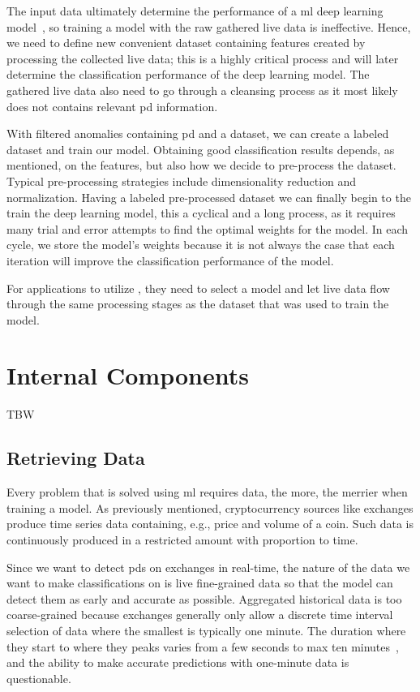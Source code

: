 The input data ultimately determine the performance of a \ac{ml} deep learning model~\cite{mike_voets}, so training a model with the raw gathered live data is ineffective. Hence, we need to define new convenient dataset containing features created by processing the collected live data; this is a highly critical process and will later determine the classification performance of the deep learning model. The gathered live data also need to go through a cleansing process as it most likely does not contains relevant \ac{pd} information.

With filtered anomalies containing \ac{pd} and a dataset, we can create a labeled dataset and train our model. Obtaining good classification results depends, as mentioned, on the features, but also how we decide to pre-process the dataset. Typical pre-processing strategies include dimensionality reduction and normalization. Having a labeled pre-processed dataset we can finally begin to the train the deep learning model, this a cyclical and a long process, as it requires many trial and error attempts to find the optimal weights for the model. In each cycle, we store the model's weights because it is not always the case that each iteration will improve the classification performance of the model.

For applications to utilize \project, they need to select a model and let live data flow through the same processing stages as the dataset that was used to train the model.

\section{Internal Components}
TBW

\subsection{Retrieving Data}
Every problem that is solved using \ac{ml} requires data, the more, the merrier when training a model. As previously mentioned, cryptocurrency sources like exchanges produce time series data containing, e.g., price and volume of a coin. Such data is continuously produced in a restricted amount with proportion to time.

Since we want to detect \acp{pd} on exchanges in real-time, the nature of the data we want to make classifications on is  live fine-grained data so that the model can detect them as early and accurate as possible. Aggregated historical data is too coarse-grained because exchanges generally only allow a discrete time interval selection of data where the smallest is typically one minute. The duration where they start to where they peaks varies from a few seconds to max ten minutes~\cite{P&D_MIT_crypto, P&D_to_the_moon}, and the ability to make accurate predictions with one-minute data is questionable.

